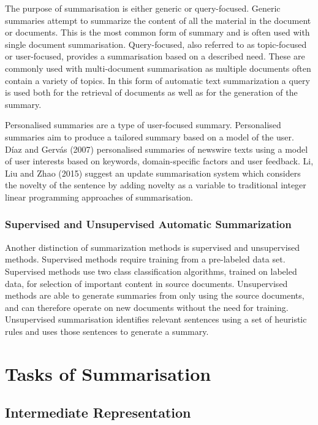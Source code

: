 The purpose of summarisation is either generic or query-focused. Generic summaries attempt to summarize the content of all the material in the document or documents. This is the most common form of summary and is often used with single document summarisation. Query-focused, also referred to as topic-focused or user-focused, provides a summarisation based on a described need. These are commonly used with multi-document summarisation as multiple documents often contain a variety of topics. In this form of automatic text summarization a query is used both for the retrieval of documents as well as for the generation of the summary. 

Personalised summaries are a type of user-focused summary. Personalised summaries aim to produce a tailored summary based on a model of the user. Díaz and Gervás (2007) personalised summaries of newswire texts using a model of user interests based on keywords, domain-specific factors and user feedback. Li, Liu and Zhao (2015) suggest an update summarisation system which considers the novelty of the sentence by adding novelty as a variable to traditional integer linear programming approaches of summarisation.

\subsubsection{Supervised and Unsupervised Automatic Summarization}

Another distinction of summarization methods is supervised and unsupervised methods. Supervised methods require training from a pre-labeled data set. Supervised methods use two class classification algorithms, trained on labeled data, for selection of important content in source documents. Unsupervised methods are able to generate summaries from only using the source documents, and can therefore operate on new documents without the need for training. Unsupervised summarisation identifies relevant sentences using a set of heuristic rules and uses those sentences to generate a summary.


\section{Tasks of Summarisation}

\subsection{Intermediate Representation}

